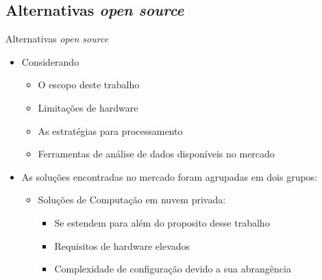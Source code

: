 \documentclass[10pt,brazil]{beamer}
\theoremstyle{definition}
\begin{document}

\subsection{Alternativas \emph{open source}}

\begin{frame}{Alternativas \emph{open source}}
  \begin{itemize}
    \item Considerando
          \begin{itemize}
            \item O escopo deste trabalho
            \item Limitações de hardware
            \item As estratégias para processamento
            \item Ferramentas de análise de dados disponíveis no mercado
          \end{itemize}
    \item [] As soluções encontradas no mercado foram agrupadas em dois grupos:
          \begin{itemize}
            \item Soluções de Computação em nuvem privada:
                  \begin{itemize}
                    \item Se estendem para além do proposito desse trabalho
                    \item Requisitos de hardware elevados
                    \item Complexidade de configuração devido a sua abrangência
                  \end{itemize}
          \end{itemize}
  \end{itemize}
\end{frame}
\end{document}
